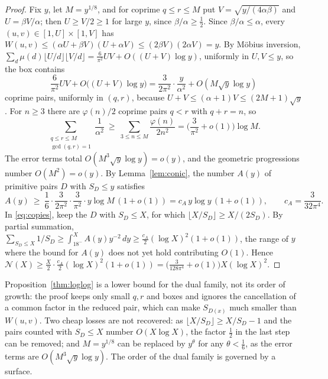 \documentclass[11pt]{amsart}
\theoremstyle{definition}
\theoremstyle{remark}
\newcommand{\N}{\mathcal{N}}
\begin{document}
\begin{proof}
Fix $y$, let $M=y^{1/8}$, and for coprime $q\le r\le M$ put $V=\sqrt{y/(4\alpha\beta)}$ and $U=\beta V/\alpha$; then $U\ge V/2\ge1$ for large $y$, since $\beta/\alpha\ge\frac12$. Since $\beta/\alpha\le\alpha$, every $(u,v)\in[1,U]\times[1,V]$ has $W(u,v)\le(\alpha U+\beta V)(U+\alpha V)\le(2\beta V)(2\alpha V)=y$. By M\"obius inversion, $\sum_{d}\mu(d)\lfloor U/d\rfloor\lfloor V/d\rfloor=\frac6{\pi^2}UV+O((U+V)\log y)$, uniformly in $U,V\le y$, so the box contains
\[
  \frac6{\pi^2}UV+O\big((U+V)\log y\big)=\frac3{2\pi^2}\cdot\frac y{\alpha^2}+O(M\sqrt y\log y)
\]
coprime pairs, uniformly in $(q,r)$, because $U+V\le(\alpha+1)V\le(2M+1)\sqrt y$. For $n\ge3$ there are $\varphi(n)/2$ coprime pairs $q<r$ with $q+r=n$, so
\[
  \sum_{\substack{q\le r\le M\\ \gcd(q,r)=1}}\frac1{\alpha^2}\ \ge\ \sum_{3\le n\le M}\frac{\varphi(n)}{2n^2}=\Big(\frac3{\pi^2}+o(1)\Big)\log M .
\]
The error terms total $O(M^3\sqrt y\log y)=o(y)$, and the geometric progressions number $O(M^2)=o(y)$. By Lemma~\ref{lem:conic}, the number $A(y)$ of primitive pairs $D$ with $S_D\le y$ satisfies
\[
  A(y)\ \ge\ \frac16\cdot\frac3{2\pi^2}\cdot\frac3{\pi^2}\cdot y\log M\,(1+o(1))=c_A\,y\log y\,(1+o(1)),\qquad c_A=\frac3{32\pi^4}.
\]
In \eqref{eq:copies}, keep the $D$ with $S_D\le X$, for which $\lfloor X/S_D\rfloor\ge X/(2S_D)$. By partial summation, $\sum_{S_D\le X}1/S_D\ge\int_{18^-}^XA(y)y^{-2}\,dy\ge\frac{c_A}2(\log X)^2(1+o(1))$, the range of $y$ where the bound for $A(y)$ does not yet hold contributing $O(1)$. Hence $\N(X)\ge\frac X2\cdot\frac{c_A}2(\log X)^2(1+o(1))=\big(\frac3{128\pi^4}+o(1)\big)X(\log X)^2$.
\end{proof}

Proposition~\ref{thm:loglog} is a lower bound for the dual family, not its order of growth: the proof keeps only small $q,r$ and boxes and ignores the cancellation of a common factor in the reduced pair, which can make $S_{D(x)}$ much smaller than $W(u,v)$. Two cheap losses are not recovered: as $\lfloor X/S_D\rfloor\ge X/S_D-1$ and the pairs counted with $S_D\le X$ number $O(X\log X)$, the factor $\frac12$ in the last step can be removed; and $M=y^{1/8}$ can be replaced by $y^\theta$ for any $\theta<\frac16$, as the error terms are $O(M^3\sqrt y\log y)$. The order of the dual family is governed by a surface.
\end{document}
